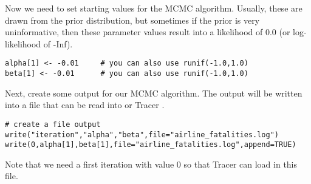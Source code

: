 Now we need to set starting values for the MCMC algorithm.
Usually, these are drawn from the prior distribution, but sometimes if the prior is very uninformative, then these parameter values result into a likelihood of 0.0 (or log-likelihood of -Inf).
{\tt \begin{snugshade*}
\begin{lstlisting}    
alpha[1] <- -0.01     # you can also use runif(-1.0,1.0)
beta[1] <- -0.01      # you can also use runif(-1.0,1.0)
\end{lstlisting}
\end{snugshade*}}
Next, create some output for our MCMC algorithm.
The output will be written into a file that can be read into \R or Tracer \citep{rambaut09}.
{\tt \begin{snugshade*}
\begin{lstlisting}    
# create a file output
write("iteration","alpha","beta",file="airline_fatalities.log")
write(0,alpha[1],beta[1],file="airline_fatalities.log",append=TRUE)
\end{lstlisting}
\end{snugshade*}}
Note that we need a first iteration with value 0 so that Tracer can load in this file.

